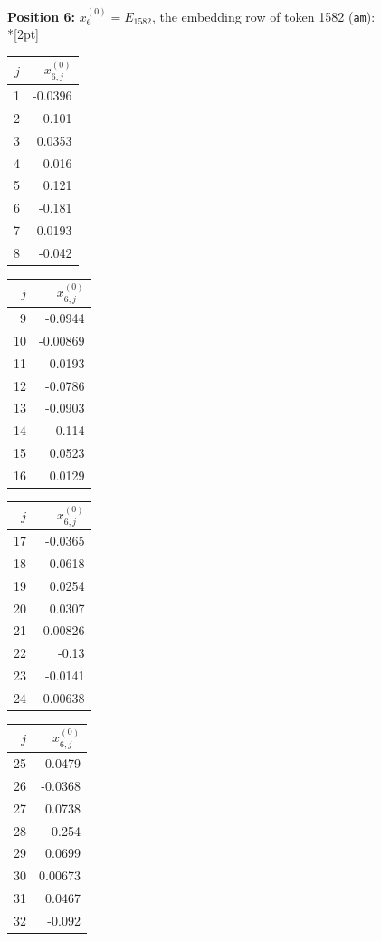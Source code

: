\noindent \textbf{Position 6:} $x^{(0)}_{6} = E_{1582}$, the embedding row of token 1582 (\texttt{\textvisiblespace{}am}):\\*[2pt]
{\tablefont \begin{tabular}[t]{r|r}
$j$ & $x^{(0)}_{6,j}$ \\\hline
1 & -0.0396 \\
2 & 0.101 \\
3 & 0.0353 \\
4 & 0.016 \\
5 & 0.121 \\
6 & -0.181 \\
7 & 0.0193 \\
8 & -0.042
\end{tabular}\kern4pt
\begin{tabular}[t]{r|r}
$j$ & $x^{(0)}_{6,j}$ \\\hline
9 & -0.0944 \\
10 & -0.00869 \\
11 & 0.0193 \\
12 & -0.0786 \\
13 & -0.0903 \\
14 & 0.114 \\
15 & 0.0523 \\
16 & 0.0129
\end{tabular}\kern4pt
\begin{tabular}[t]{r|r}
$j$ & $x^{(0)}_{6,j}$ \\\hline
17 & -0.0365 \\
18 & 0.0618 \\
19 & 0.0254 \\
20 & 0.0307 \\
21 & -0.00826 \\
22 & -0.13 \\
23 & -0.0141 \\
24 & 0.00638
\end{tabular}\kern4pt
\begin{tabular}[t]{r|r}
$j$ & $x^{(0)}_{6,j}$ \\\hline
25 & 0.0479 \\
26 & -0.0368 \\
27 & 0.0738 \\
28 & 0.254 \\
29 & 0.0699 \\
30 & 0.00673 \\
31 & 0.0467 \\
32 & -0.092
\end{tabular}\kern4pt
\begin{tabular}[t]{r|r}

\end{tabular}}
